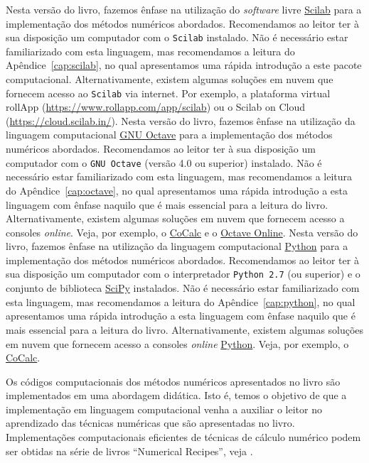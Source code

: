 \ifisscilab
Nesta versão do livro, fazemos ênfase na utilização do \emph{software} livre \href{https://www.scilab.org/}{Scilab} para a implementação dos métodos numéricos abordados. Recomendamos ao leitor ter à sua disposição um computador com o \verb+Scilab+ instalado. Não é necessário estar familiarizado com esta linguagem, mas recomendamos a leitura do Apêndice~\ref{cap:scilab}, no qual apresentamos uma rápida introdução a este pacote computacional. Alternativamente, existem algumas soluções em nuvem que fornecem acesso ao \verb+Scilab+ via internet. Por exemplo, a plataforma virtual rollApp (\url{https://www.rollapp.com/app/scilab}) ou o Scilab on Cloud (\url{https://cloud.scilab.in/}).
\fi
\ifisoctave
Nesta versão do livro, fazemos ênfase na utilização da linguagem computacional \href{https://www.gnu.org/software/octave/}{GNU Octave} para a implementação dos métodos numéricos abordados. Recomendamos ao leitor ter à sua disposição um computador com o \verb+GNU Octave+ (versão 4.0 ou superior) instalado. Não é necessário estar familiarizado com esta linguagem, mas recomendamos a leitura do Apêndice~\ref{cap:octave}, no qual apresentamos uma rápida introdução a esta linguagem com ênfase naquilo que é mais essencial para a leitura do livro. Alternativamente, existem algumas soluções em nuvem que fornecem acesso a consoles {\it online}. Veja, por exemplo, o \href{https://cocalc.com}{CoCalc} e o \href{https://octave-online.net/}{Octave Online}.
\fi
\ifispython
Nesta versão do livro, fazemos ênfase na utilização da linguagem computacional \href{https://www.python.org/}{Python} para a implementação dos métodos numéricos abordados. Recomendamos ao leitor ter à sua disposição um computador com o interpretador \verb+Python 2.7+ (ou superior) e o conjunto de biblioteca \href{https://www.scipy.org/}{SciPy} instalados. Não é necessário estar familiarizado com esta linguagem, mas recomendamos a leitura do Apêndice~\ref{cap:python}, no qual apresentamos uma rápida introdução a esta linguagem com ênfase naquilo que é mais essencial para a leitura do livro. Alternativamente, existem algumas soluções em nuvem que fornecem acesso a consoles {\it online} \href{https://www.python.org/}{Python}. Veja, por exemplo, o \href{https://cocalc.com}{CoCalc}.
\fi

Os códigos computacionais dos métodos numéricos apresentados no livro são implementados em uma abordagem didática. Isto é, temos o objetivo de que a implementação em linguagem computacional venha a auxiliar o leitor no aprendizado das técnicas numéricas que são apresentadas no livro. Implementações computacionais eficientes de técnicas de cálculo numérico podem ser obtidas na série de livros ``Numerical Recipes'', veja \cite{numerical}.
